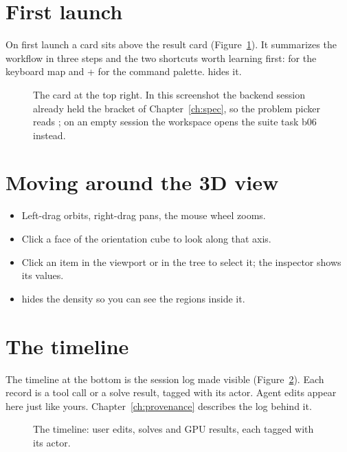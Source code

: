 \section{First launch}
On first launch a  card sits above the result card (Figure~\ref{fig:firstrun}). It summarizes the
workflow in three steps and the two shortcuts worth learning first:  for the keyboard map and
+ for the command palette.  hides it.

\begin{figure}[t]
\caption{The  card at the top right. In this screenshot the backend session already held the
bracket of Chapter~\ref{ch:spec}, so the problem picker reads ; on an empty session the workspace opens
the suite task b06 instead.}
\label{fig:firstrun}
\end{figure}

\section{Moving around the 3D view}
\begin{itemize}
  \item Left-drag orbits, right-drag pans, the mouse wheel zooms.
  \item Click a face of the orientation cube to look along that axis.
  \item Click an item in the viewport or in the tree to select it; the inspector shows its values.
  \item {} hides the density so you can see the regions inside it.
\end{itemize}

\section{The timeline}
The timeline at the bottom is the session log made visible (Figure~\ref{fig:timeline}). Each record is a tool call or a
solve result, tagged with its actor. Agent edits appear here just like yours. Chapter~\ref{ch:provenance} describes the
log behind it.

\begin{figure}[h]
\caption{The timeline: user edits, solves and GPU results, each tagged with its actor.}
\label{fig:timeline}
\end{figure}

